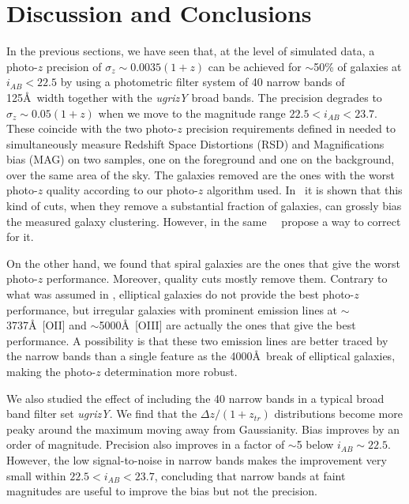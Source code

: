 \section{Discussion and Conclusions}
\label{sec:discussion}
In the previous sections, we have seen that, at the level of simulated data, a photo-$z$ precision of $\sigma_z \sim 0.0035(1+z)$ can be achieved for $\sim$50\% of galaxies at $i_{AB}<22.5$ by using a photometric filter system of 40 narrow bands of 125\AA \ width together with the \textit{ugrizY} broad bands. The precision degrades to $\sigma_z \sim 0.05(1+z)$ when we move to the magnitude range $22.5<i_{AB}<23.7$. These coincide with the two photo-$z$ precision requirements defined in \citet{Gaztanaga2012} needed to simultaneously measure Redshift Space Distortions (RSD) and Magnifications bias (MAG) on two samples, one on the foreground and one on the background, over the same area of the sky. The galaxies removed are the ones with the worst photo-$z$ quality according to our photo-$z$ algorithm used. In \paperodds\ it is shown that this kind of cuts, when they remove a substantial fraction of galaxies, can grossly bias the measured galaxy clustering. However, in the same \doctype\ \we\ propose a way to correct for it. 

On the other hand, we found that spiral galaxies are the ones that give the worst photo-$z$ performance. Moreover, quality cuts mostly remove them. Contrary to what was assumed in \cite{Benitez2009}, elliptical galaxies do not provide the best photo-$z$ performance, but irregular galaxies with prominent emission lines at $\sim$3737\AA \ [OII] and $\sim$5000\AA \ [OIII] are actually the ones that give the best performance. A possibility is that these two emission lines are better traced by the narrow bands than a single feature as the 4000\AA \ break of elliptical galaxies, making the photo-$z$ determination more robust. 

We also studied the effect of including the 40 narrow bands in a typical broad band filter set \textit{ugrizY}. We find that the $\Delta z / (1+z_{tr})$ distributions become more peaky around the maximum moving away from Gaussianity. Bias improves by an order of magnitude. Precision also improves in a factor of $\sim$5 below $i_{AB}\sim22.5$. However, the low signal-to-noise in narrow bands makes the improvement very small within $22.5<i_{AB}<23.7$, concluding that narrow bands at faint magnitudes are useful to improve the bias but not the precision.

